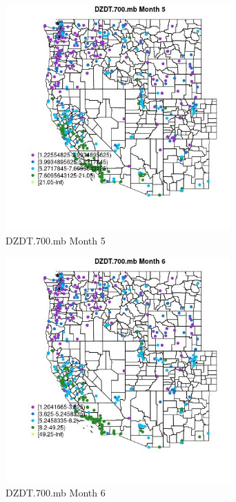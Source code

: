 \begin{figure} 
\centering  
\includegraphics[width=0.77\textwidth]{Code_Outputs/ML_input_report_ML_input_PM25_Step5_part_d_de_duplicated_aves_ML_input_MapObsMo5DZDT700mb.jpg} 
\caption{\label{fig:ML_input_report_ML_input_PM25_Step5_part_d_de_duplicated_aves_ML_inputMapObsMo5DZDT700mb}DZDT.700.mb Month 5} 
\end{figure} 
 

\clearpage 

\begin{figure} 
\centering  
\includegraphics[width=0.77\textwidth]{Code_Outputs/ML_input_report_ML_input_PM25_Step5_part_d_de_duplicated_aves_ML_input_MapObsMo6DZDT700mb.jpg} 
\caption{\label{fig:ML_input_report_ML_input_PM25_Step5_part_d_de_duplicated_aves_ML_inputMapObsMo6DZDT700mb}DZDT.700.mb Month 6} 
\end{figure} 
 

